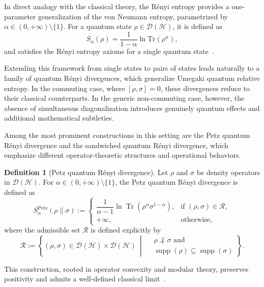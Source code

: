\documentclass[a4paper, amsfonts, amssymb, amsmath, reprint, showkeys, nofootinbib, twoside, aps, pra]{revtex4-2}
\theoremstyle{definition}
\newtheorem{definition}{Definition}
\begin{document}
In direct analogy with the classical theory, the Rényi entropy provides a one-parameter
generalization of the von Neumann entropy, parametrized by
$\alpha \in (0,+\infty)\setminus\{1\}$.
For a quantum state $\rho \in \mathcal{D}(\mathcal{H})$, it is defined as
\begin{equation}
S_{\alpha}(\rho)
=
\frac{1}{1-\alpha}
\ln \mathrm{Tr}\!\left(\rho^{\alpha}\right),
\end{equation}
and satisfies the Rényi entropy axioms for a single quantum state~\cite{muellerlennert2013}.

Extending this framework from single states to pairs of states leads naturally to a
family of quantum Rényi divergences, which generalize Umegaki quantum relative entropy.
In the commuting case, where $[\rho,\sigma]=0$, these divergences reduce to their
classical counterparts. In the generic non-commuting case, however, the absence of simultaneous diagonalization
introduces genuinely quantum effects and additional mathematical subtleties.

Among the most prominent constructions in this setting are the Petz quantum Rényi
divergence and the sandwiched quantum Rényi divergence, which emphasize different
operator-theoretic structures and operational behaviors.

\begin{definition}[Petz quantum Rényi divergence]
    Let $\rho$ and $\sigma$ be density operators in $\mathcal{D}(\mathcal{H})$. For $\alpha \in (0,+\infty)\setminus\{1\}$, the Petz quantum Rényi divergence is defined as
    \begin{equation}
        S_{\alpha}^{\mathrm{Petz}}(\rho \parallel \sigma)
        :=
        \begin{cases}
            \dfrac{1}{\alpha - 1} \ln \operatorname{Tr}(\rho^{\alpha}\sigma^{1-\alpha}),
            & \text{if } (\rho, \sigma) \in \mathcal{R}, \\
            +\infty, & \text{otherwise,}
        \end{cases}
        \label{eq:petz}
    \end{equation}
    where the admissible set $\mathcal{R}$ is defined explicitly by
    \[
        \mathcal{R} := \left\{ (\rho,\sigma) \in \mathcal{D}(\mathcal{H}) \times \mathcal{D}(\mathcal{H})
        \ \middle|\ \begin{aligned} &\rho \not\perp \sigma \text{ and} \\ &\operatorname{supp}(\rho) \subseteq \operatorname{supp}(\sigma) \end{aligned} \right\}.
    \]
\end{definition}
This construction, rooted in operator convexity and modular theory, preserves
positivity and admits a well-defined classical limit~\cite{Petz1986,Petz1986b}.
\end{document}
